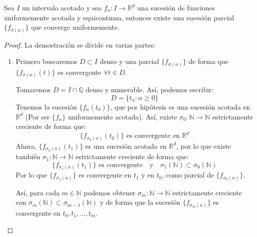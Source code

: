 \begin{teo}\label{teo:Ascoli-A}
    Sea $I$ un intervalo acotado y sea $f_n:I\to \mathbb{R}^d$ una sucesión de funciones uniformemente acotada y equicontinua, entonces existe una sucesión parcial $\{f_{\sigma(n)}\}$ que converge uniformemente.

    \begin{proof} 
        La demostración se divide en varias partes:
        \begin{enumerate}
            \item Primero buscaremos $D\subset I$ denso y una parcial $\{f_{\sigma(n)}\}$ de forma que $\{f_{\sigma(n)}(t)\}$ es convergente $\forall t\in D$.

                Tomaremos $D = I\cap \mathbb{Q}$ denso y numerable. Así, podemos escribir:
                \begin{equation*}
                    D = \{t_n : n\geq 0\}
                \end{equation*}
                Tenemos la sucesión $\{f_n(t_0)\}$, que por hipótesis es una sucesión acotada en $\mathbb{R}^d$ (Por ser $\{f_n\}$ uniformemente acotada). Así, existe $\sigma_0:\mathbb{N}\to \mathbb{N}$ estrictamente creciente de forma que:
                \begin{equation*}
                    \{f_{\sigma_0(n)}(t_0)\} \text{\ es convergente en\ } \mathbb{R}^d
                \end{equation*}
                Ahora, $\{f_{\sigma_0(n)}(t_1)\}$ es una sucesión acotada en $\mathbb{R}^d$, por lo que existe también $\sigma_1:\mathbb{N}\to \mathbb{N}$ estrictamente creciente de forma que:
                \begin{equation*}
                    \{f_{\sigma_1(n)}(t_1)\} \text{\ es convergente}  \quad \text{y} \quad \sigma_1(\mathbb{N}) \subset \sigma_0(\mathbb{N})
                \end{equation*}
                Por lo que $\{f_{\sigma_1(n)}\}$ es convergente en $t_1$ y en $t_0$, como parcial de $\{f_{\sigma_0(n)}\}$.

                Así, para cada $m\in \mathbb{N}$ podemos obtener $\sigma_m:\mathbb{N}\to \mathbb{N}$ estrictamente creciente con $\sigma_m(\mathbb{N})\subset \sigma_{m-1}(\mathbb{N})$ y de forma que la sucesión $\{f_{\sigma_m(n)}\}$ es convergente en $t_0,t_1,\ldots,t_m$.


\end{enumerate}
\end{proof}
\end{teo}
